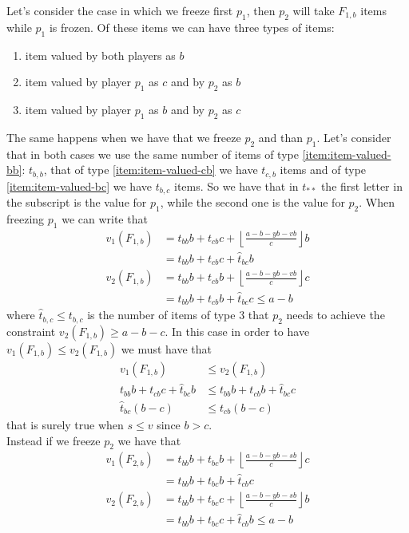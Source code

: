 Let's consider the case in which we freeze first $p_1$, then $p_2$ will take $F_{1,b}$ items while $p_1$ is frozen. Of these items we can have three types of items: 
\begin{enumerate}
    \item item valued by both players as $b$ \label{item:item-valued-bb}%
    \item item valued by player $p_1$ as $c$ and by $p_2$ as $b$ \label{item:item-valued-cb} %
    \item item valued by player $p_1$ as $b$ and by $p_2$ as $c$ \label{item:item-valued-bc}%
\end{enumerate}
The same happens when we have that we freeze $p_2$ and than $p_1$. Let's consider that in both cases we use the same number of items of type \ref{item:item-valued-bb}: $t_{b,b}$, that of type \ref{item:item-valued-cb} we have $t_{c,b}$ items and of type \ref{item:item-valued-bc} we have $t_{b,c}$ items. So we have that in $t_{**}$ the first letter in the subscript is the value for $p_1$, while the second one is the value for $p_2$.
When freezing $p_1$ we can write that 
\begin{align*}
    v_1(F_{1,b}) &= t_{bb}b + t_{cb}c + \left\lfloor \frac{a-b-yb-vb}{c}\right\rfloor b \\
                & = t_{bb}b + t_{cb}c + \hat{t}_{bc} b\\
    v_2(F_{1,b}) &= t_{bb}b + t_{cb}b + \left\lfloor \frac{a-b-yb-vb}{c}\right\rfloor c \\
                & = t_{bb}b + t_{cb}b + \hat{t}_{bc} c \le a-b
\end{align*}
where $\hat{t}_{b,c}\le t_{b,c}$ is the number of items of type $3$ that $p_2$ needs to achieve the constraint $v_2(F_{1,b})\ge a-b-c$. In this case in order to have $v_1(F_{1,b}) \le v_2(F_{1,b})$ we must have that
\begin{align*}
    v_1(F_{1,b}) &\le v_2(F_{1,b})\\
    t_{bb}b + t_{cb}c + \hat{t}_{bc} b &\le t_{bb}b + t_{cb}b + \hat t_{bc} c\\
    \hat t_{bc}(b-c) &\le t_{cb}(b-c)
\end{align*}
that is surely true when $s\le v$ since $b> c$.\\
Instead if we freeze $p_2$ we have that
\begin{align*}
    v_1(F_{2,b}) &= t_{bb}b + t_{bc}b + \left\lfloor \frac{a-b-yb-sb}{c}\right\rfloor c \\
                & = t_{bb}b + t_{bc}b + \hat t_{cb} c\\
    v_2(F_{2,b}) &= t_{bb}b + t_{bc}c + \left\lfloor \frac{a-b-yb-sb}{c}\right\rfloor b \\
                & = t_{bb}b + t_{bc}c + \hat t_{cb} b \le a-b
\end{align*}
